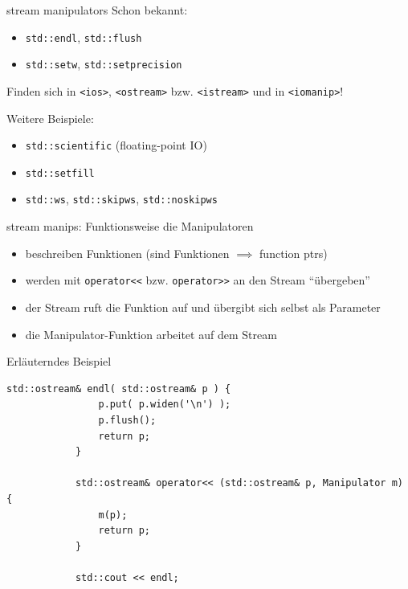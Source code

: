 \begin{frame}{stream manipulators}
	Schon bekannt:
	\begin{itemize}
		\item \texttt{std::endl}, \texttt{std::flush}
		\item \texttt{std::setw}, \texttt{std::setprecision}
	\end{itemize}
	
	\vspace{1em}
	
	Finden sich in \texttt{<ios>}, \texttt{<ostream>} bzw. \texttt{<istream>} und in \texttt{<iomanip>}!
	
	\vspace{1em}
	
	Weitere Beispiele:
	\begin{itemize}
		\item \texttt{std::scientific} (floating-point IO)
		\item \texttt{std::setfill}
		\item \texttt{std::ws}, \texttt{std::skipws}, \texttt{std::noskipws}
	\end{itemize}
\end{frame}

\begin{frame}[fragile]{stream manips: Funktionsweise}
	\footnotesize
	die Manipulatoren
	\begin{itemize}
		\item beschreiben Funktionen (sind Funktionen $\implies$ function ptrs)
		\item werden mit \texttt{operator<<} bzw. \texttt{operator>>} an den Stream \enquote{übergeben}
		\item der Stream ruft die Funktion auf und übergibt sich selbst als Parameter
		\item die Manipulator-Funktion arbeitet auf dem Stream
	\end{itemize}
	
	\pause
	
	\begin{block}{Erläuterndes Beispiel}
		\begin{lstlisting}[basicstyle=\tiny, xleftmargin=3em]
			std::ostream& endl( std::ostream& p ) {
			    p.put( p.widen('\n') );
			    p.flush();
			    return p;
			}
			
			std::ostream& operator<< (std::ostream& p, Manipulator m) {
			    m(p);
			    return p;
			}
			
			std::cout << endl;
		\end{lstlisting}
	\end{block}
\end{frame}


